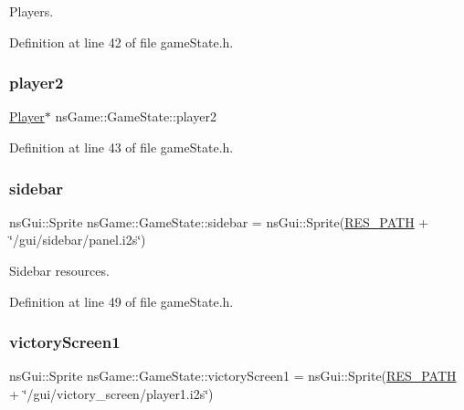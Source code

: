 Players. 



Definition at line 42 of file game\+State.\+h.

\mbox{\label{classns_game_1_1_game_state_abd99551650ebb05056576dd2fee40b4b}} 
\subsubsection{\texorpdfstring{player2}{player2}}
{\footnotesize\ttfamily \hyperlink{classns_game_1_1_player}{Player}$\ast$ ns\+Game\+::\+Game\+State\+::player2}



Definition at line 43 of file game\+State.\+h.

\mbox{\label{classns_game_1_1_game_state_a144f7f71a2a43f8422a346e4bc9bb923}} 
\subsubsection{\texorpdfstring{sidebar}{sidebar}}
{\footnotesize\ttfamily ns\+Gui\+::\+Sprite ns\+Game\+::\+Game\+State\+::sidebar = ns\+Gui\+::\+Sprite(\hyperlink{definitions_8h_a793644bd88146828177a2a4f57e3bf01}{R\+E\+S\+\_\+\+P\+A\+TH} + \char`\"{}/gui/sidebar/panel.\+i2s\char`\"{})}



Sidebar resources. 



Definition at line 49 of file game\+State.\+h.

\mbox{\label{classns_game_1_1_game_state_a23ea4a0acc9d2f56f9c324ccfa6560ec}} 
\subsubsection{\texorpdfstring{victory\+Screen1}{victoryScreen1}}
{\footnotesize\ttfamily ns\+Gui\+::\+Sprite ns\+Game\+::\+Game\+State\+::victory\+Screen1 = ns\+Gui\+::\+Sprite(\hyperlink{definitions_8h_a793644bd88146828177a2a4f57e3bf01}{R\+E\+S\+\_\+\+P\+A\+TH} + \char`\"{}/gui/victory\+\_\+screen/player1.\+i2s\char`\"{})}




